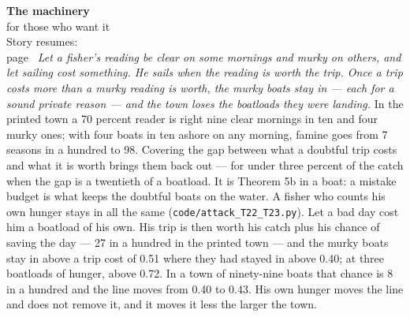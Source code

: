 \begin{machinery}{\textbf{The machinery}\\for those who want it\\[3pt]{\color{muted}Story resumes:\\page~\pageref{ch12}}}
\noindent \emph{Let a fisher's
reading be clear on some mornings and murky on others, and let sailing
cost something. He sails when the reading is worth the trip. Once a
trip costs more than a murky reading is worth, the murky boats stay in
--- each for a sound private reason --- and the town loses the boatloads
they were landing.} In the printed town a 70 percent reader is right
nine clear mornings in ten and four murky ones; with four boats in ten
ashore on any morning, famine goes from 7 seasons in a hundred to 98.
Covering the gap between what a doubtful trip costs and what it is
worth brings them back out --- for under three percent of the catch when
the gap is a twentieth of a boatload. It is Theorem 5b in a boat: a
mistake budget is what keeps the doubtful boats on the water. A fisher
who counts his own hunger stays in all the same
(\texttt{code/\allowbreak{}attack\_\allowbreak{}T22\_\allowbreak{}T23.\allowbreak{}py}). Let a bad day cost him a boatload of his
own. His trip is then worth his catch plus his chance of saving the
day --- 27 in a hundred in the printed town --- and the murky boats stay
in above a trip cost of 0.51 where they had stayed in above 0.40; at
three boatloads of hunger, above 0.72. In a town of ninety-nine boats
that chance is 8 in a hundred and the line moves from 0.40 to 0.43.
His own hunger moves the line and does not remove it, and it moves it
less the larger the town.


\end{machinery}
